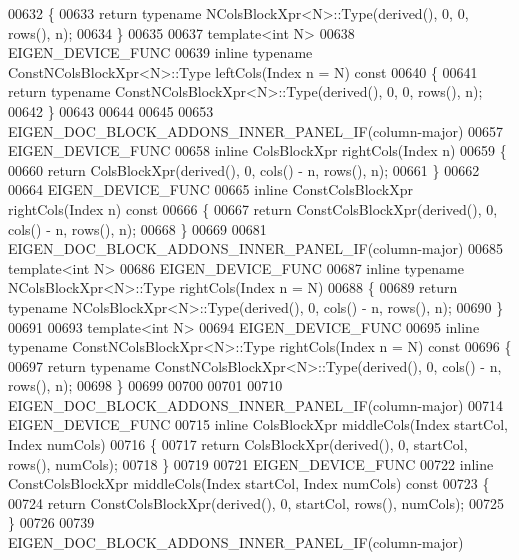 \begin{DoxyCode}
00632 \{
00633   \textcolor{keywordflow}{return} \textcolor{keyword}{typename} NColsBlockXpr<N>::Type(derived(), 0, 0, rows(), n);
00634 \}
00635 
00637 \textcolor{keyword}{template}<\textcolor{keywordtype}{int} N>
00638 EIGEN\_DEVICE\_FUNC
00639 \textcolor{keyword}{inline} \textcolor{keyword}{typename} ConstNColsBlockXpr<N>::Type leftCols(Index n = N)\textcolor{keyword}{ const}
00640 \textcolor{keyword}{}\{
00641   \textcolor{keywordflow}{return} \textcolor{keyword}{typename} ConstNColsBlockXpr<N>::Type(derived(), 0, 0, rows(), n);
00642 \}
00643 
00644 
00645 
00653 EIGEN\_DOC\_BLOCK\_ADDONS\_INNER\_PANEL\_IF(column-major)
00657 EIGEN\_DEVICE\_FUNC
00658 \textcolor{keyword}{inline} ColsBlockXpr rightCols(Index n)
00659 \{
00660   \textcolor{keywordflow}{return} ColsBlockXpr(derived(), 0, cols() - n, rows(), n);
00661 \}
00662 
00664 EIGEN\_DEVICE\_FUNC
00665 \textcolor{keyword}{inline} ConstColsBlockXpr rightCols(Index n)\textcolor{keyword}{ const}
00666 \textcolor{keyword}{}\{
00667   \textcolor{keywordflow}{return} ConstColsBlockXpr(derived(), 0, cols() - n, rows(), n);
00668 \}
00669 
00681 EIGEN\_DOC\_BLOCK\_ADDONS\_INNER\_PANEL\_IF(column-major)
00685 \textcolor{keyword}{template}<\textcolor{keywordtype}{int} N>
00686 EIGEN\_DEVICE\_FUNC
00687 \textcolor{keyword}{inline} \textcolor{keyword}{typename} NColsBlockXpr<N>::Type rightCols(Index n = N)
00688 \{
00689   \textcolor{keywordflow}{return} \textcolor{keyword}{typename} NColsBlockXpr<N>::Type(derived(), 0, cols() - n, rows(), n);
00690 \}
00691 
00693 \textcolor{keyword}{template}<\textcolor{keywordtype}{int} N>
00694 EIGEN\_DEVICE\_FUNC
00695 \textcolor{keyword}{inline} \textcolor{keyword}{typename} ConstNColsBlockXpr<N>::Type rightCols(Index n = N)\textcolor{keyword}{ const}
00696 \textcolor{keyword}{}\{
00697   \textcolor{keywordflow}{return} \textcolor{keyword}{typename} ConstNColsBlockXpr<N>::Type(derived(), 0, cols() - n, rows(), n);
00698 \}
00699 
00700 
00701 
00710 EIGEN\_DOC\_BLOCK\_ADDONS\_INNER\_PANEL\_IF(column-major)
00714 EIGEN\_DEVICE\_FUNC
00715 \textcolor{keyword}{inline} ColsBlockXpr middleCols(Index startCol, Index numCols)
00716 \{
00717   \textcolor{keywordflow}{return} ColsBlockXpr(derived(), 0, startCol, rows(), numCols);
00718 \}
00719 
00721 EIGEN\_DEVICE\_FUNC
00722 \textcolor{keyword}{inline} ConstColsBlockXpr middleCols(Index startCol, Index numCols)\textcolor{keyword}{ const}
00723 \textcolor{keyword}{}\{
00724   \textcolor{keywordflow}{return} ConstColsBlockXpr(derived(), 0, startCol, rows(), numCols);
00725 \}
00726 
00739 EIGEN\_DOC\_BLOCK\_ADDONS\_INNER\_PANEL\_IF(column-major)

\end{DoxyCode}
